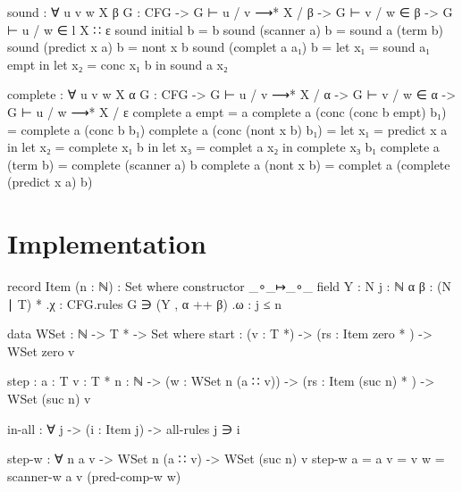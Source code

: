 		\begin{code}
	
			sound : ∀ {u v w X β} {G : CFG} ->
			  G ⊢ u / v ⟶* X / β ->
			  G ⊢ v / w ∈ β ->
			    G ⊢ u / w ∈ l X ∷ ε
			sound initial b = b
			sound (scanner a) b = sound a (term b)
			sound (predict x a) b = nont x b
			sound (complet a a₁) b =
			  let x₁ = sound a₁ empt in
			  let x₂ = conc x₁ b in
			  sound a x₂
	
		\end{code}
	
		\begin{code}
			
			complete : ∀ {u v w X α} {G : CFG} ->
			  G ⊢ u / v ⟶* X / α ->
			  G ⊢ v / w ∈ α ->
			    G ⊢ u / w ⟶* X / ε
			complete a empt = a
			complete a (conc (conc b empt) b₁) = complete a (conc b b₁)
			complete a (conc (nont x b) b₁) =
			  let x₁ = predict x a in
			  let x₂ = complete x₁ b in
			  let x₃ = complet a x₂ in
			  complete x₃ b₁
			complete a (term b) = complete (scanner a) b
			complete a (nont x b) = complet a (complete (predict x a) b)
	
		\end{code}
	
	\section{Implementation}

		\begin{code}
	
			record Item (n : ℕ) : Set where
			  constructor _∘_↦_∘_
			  field
			    Y : N
			    j : ℕ
			    α β : (N ∣ T) *
			    .{χ} : CFG.rules G ∋ (Y , α ++ β)
			    .{ω} : j ≤ n
	
		\end{code}
	
		\begin{code}
	
			data WSet : ℕ -> T * -> Set where
			  start :
			    (v : T *) ->
			    (rs : Item zero * ) ->
			    WSet zero v
			
			  step : {a : T} {v : T *} {n : ℕ} ->
			    (w : WSet n (a ∷ v)) ->
			    (rs : Item (suc n) * ) ->
			    WSet (suc n) v
	
		\end{code}
		
		\begin{code}
	
			in-all : ∀ {j} -> (i : Item j) -> all-rules j ∋ i
	
		\end{code}
	
		\begin{code}
	
			step-w : ∀ {n a v} ->
			  WSet n (a ∷ v) ->
			  WSet (suc n) v
			step-w {a = a} {v = v} w = scanner-w a v (pred-comp-w w)
		
		\end{code}
